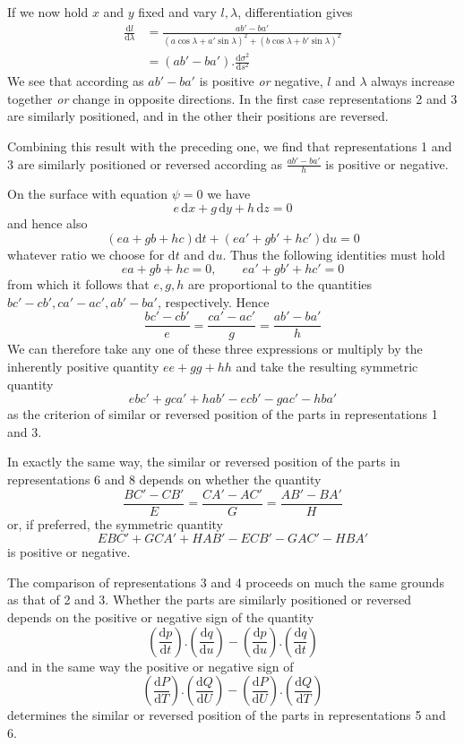 %
\noindent If we now hold \(x\) and \(y\) fixed and vary \(l,\lambda\), differentiation gives
\[
\begin{aligned}
\frac{\mathrm{d}l}{\mathrm{d}\lambda}&=\frac{ab'-ba'}{(a\cos\lambda+a'\sin\lambda)^2+(b\cos\lambda+b'\sin\lambda)^2}\\
&=(ab'-ba')\mathord{.}\frac{\mathrm{d}\sigma^2}{\mathrm{d}s^2}
\end{aligned}
\]
\noindent We see that according as \(ab'-ba'\) is positive \textit{or} negative, \(l\) and \(\lambda\) always increase together \textit{or} change in opposite directions. In the first case representations 2 and 3 are similarly positioned, and in the other their positions are reversed.

Combining this result with the preceding one, we find that representations 1 and 3 are similarly positioned or reversed according as \(\frac{ab'-ba'}{h}\) is positive or negative.

On the surface with equation \(\psi=0\) we have
\[
e\,\mathrm{d}x+g\,\mathrm{d}y+h\,\mathrm{d}z=0
\]
\noindent and hence also
\[
(ea+gb+hc)\mathrm{d}t+(ea'+gb'+hc')\mathrm{d}u=0
\]
\noindent whatever ratio we choose for \(\mathrm{d}t\) and \(\mathrm{d}u\). Thus the following identities must hold
\[
ea+gb+hc=0,\qquad ea'+gb'+hc'=0
\]
\noindent from which it follows that \(e,g,h\) are proportional to the quantities \(bc'-cb',ca'-ac',ab'-ba'\), respectively. Hence
\[
\frac{bc'-cb'}{e}=\frac{ca'-ac'}{g}=\frac{ab'-ba'}{h}
\]
\noindent We can therefore take any one of these three expressions or multiply by the inherently positive quantity \(ee+gg+hh\) and take the resulting symmetric quantity
\[
ebc'+gca'+hab'-ecb'-gac'-hba'
\]
\noindent as the criterion of similar or reversed position of the parts in representations 1 and 3.

In exactly the same way, the similar or reversed position of the parts in representations 6 and 8 depends on whether the quantity
\[
\frac{BC'-CB'}{E}=\frac{CA'-AC'}{G}=\frac{AB'-BA'}{H}
\]
%
\noindent or, if preferred, the symmetric quantity
\[
EBC'+GCA'+HAB'-ECB'-GAC'-HBA'
\]
\noindent is positive or negative.

The comparison of representations 3 and 4 proceeds on much the same grounds as that of 2 and 3. Whether the parts are similarly positioned or reversed depends on the positive or negative sign of the quantity
\[
(\frac{\mathrm{d}p}{\mathrm{d}t})\mathord{.}(\frac{\mathrm{d}q}{\mathrm{d}u})-(\frac{\mathrm{d}p}{\mathrm{d}u})\mathord{.}(\frac{\mathrm{d}q}{\mathrm{d}t})
\]
\noindent and in the same way the positive or negative sign of
\[
(\frac{\mathrm{d}P}{\mathrm{d}T})\mathord{.}(\frac{\mathrm{d}Q}{\mathrm{d}U})-(\frac{\mathrm{d}P}{\mathrm{d}U})\mathord{.}(\frac{\mathrm{d}Q}{\mathrm{d}T})
\]
\noindent determines the similar or reversed position of the parts in representations 5 and 6.

